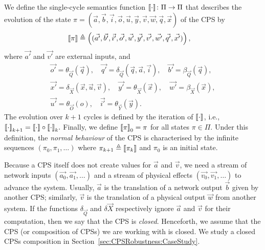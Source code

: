 {\begin{definition}
We define the single-cycle semantics function ${{{\llbracket\cdot\rrbracket}}}\colon \Pi \rightarrow \Pi$ that describes the evolution of the state $\pi=(\vec{a},\vec{b},\vec{i},\vec{o},\vec{u},\vec{y},\vec{v},\vec{w},\vec{q},\vec{x})$ of the CPS by
\begin{align}
{{\llbracket\pi\rrbracket}}&\triangleq\left((\vec{a'},\vec{b'},\vec{i'},\vec{o'},\vec{u'},\vec{y'},\vec{v'},\vec{w'},\vec{q'},\vec{x'})\right), 
\end{align}
where $\vec{a'}$ and $\vec{v'}$ are external inputs, and 
\begin{gather*}
\vec{o'}=\theta_{\vec{Q}}(\vec{q}),\quad 
\vec{q'}=\delta_{\vec{Q}}(\vec{q},\vec{a},\vec{i}),\quad 
\vec{b'}=\beta_{\vec{Q}}(\vec{q}),\\
\vec{x'}=\delta_{\vec{X}}(\vec{x},\vec{u},\vec{v}),\quad
\vec{y'}=\theta_{\vec{X}}(\vec{x}),\quad 
\vec{w'}=\beta_{\vec{X}}(\vec{x}),\\
\vec{u'}= \theta_{\vec{O}}(o),\quad\vec{i'}=\theta_{\vec{Y}}(\vec{y}).
\end{gather*}
The evolution over $k+1$ cycles is defined by the iteration of ${{{\llbracket\cdot\rrbracket}}}$, {i.e.}, 
${{{\llbracket\cdot\rrbracket}}}_{k+1}= {{{\llbracket\cdot\rrbracket}}} \circ {{{\llbracket\cdot\rrbracket}}}_{k}.$
Finally, we define ${{\llbracket\pi\rrbracket}}_{0}=\pi$ for all states $\pi \in \Pi$. Under this definition, the \emph{normal behaviour} of the CPS is characterised by the infinite sequences $(\pi_0, \pi_1, \ldots)$ where $\pi_{k+1}\triangleq{{\llbracket\pi_k\rrbracket}}$ and $\pi_0$ is an initial state.%
\end{definition}
}
Because a CPS itself does not create values for $\vec{a}$ and $\vec{v}$, we need a stream of network inputs $(\vec{a_0}, \vec{a_1}, \ldots)$ and a stream of physical effects $(\vec{v_0}, \vec{v_1}, \ldots)$ to advance the system. Usually, $\vec{a}$ is the translation of a network output $\vec{b}$ given by another CPS; similarly, $\vec{v}$ is the translation of a physical output $\vec{w}$ from another system. If the functions $\delta_{\vec{Q}}$ and $\delta{\vec{X}}$ respectively ignore $\vec{a}$ and $\vec{v}$ for their computation, then we say that the CPS is \emph{closed}.
Henceforth, we assume that the CPS (or composition of CPSs) we are working with is closed. We study a closed CPSs composition in Section~\ref{sec:CPSRobustness:CaseStudy}.

